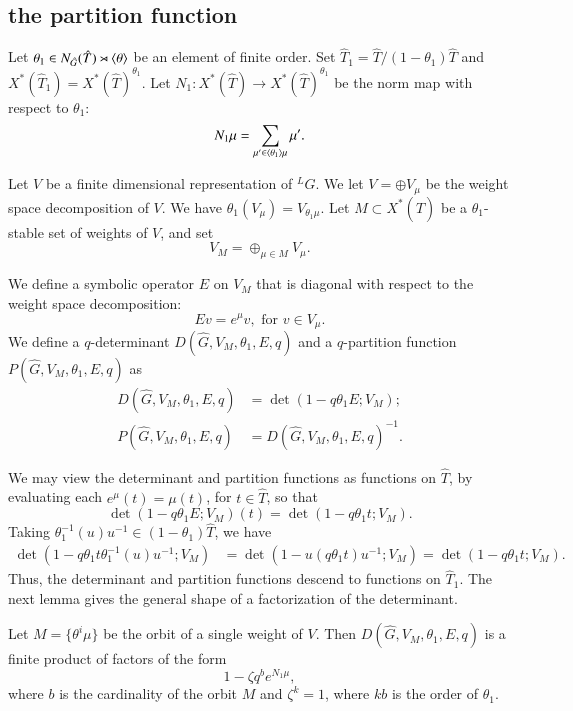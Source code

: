 \subsection{the partition function}

Let $\theta_1\in N_{\hat G}(\hat T) \rtimes \langle{\theta}\rangle$ be an element of finite order.
Set $\hat T_1 = \hat T/(1-\theta_1)\hat T$ and $X^*(\hat T_1) = X^*(\hat T)^{\theta_1}$.
Let $N_1:X^*(\hat T)\to X^*(\hat T)^{\theta_1}$ be the norm map with respect to $\theta_1$:
\[
N_1 \mu = \sum_{\mu'\in \langle{\theta_1}\rangle\mu} \mu'.
\]

Let $V$ be a finite dimensional representation of ${}^LG$.  We let $V=\oplus V_\mu$ be the weight space decomposition of $V$.
We have $\theta_1(V_\mu) = V_{\theta_1\mu}$.   Let $M\subset X^*(\hat T)$ be a $\theta_1$-stable set of weights of $V$, and
set
\[
V_M = \oplus_{\mu\in M} V_\mu.
\]

We define a symbolic operator $E$ on $V_M$ that is diagonal with
respect to the weight space decomposition:
\[
E v = e^{\mu} v, \text{ for } v \in V_\mu.
\]
We define a $q$-determinant $D(\hat G,V_M,\theta_1,E,q)$ and a $q$-partition function $P(\hat G,V_M,\theta_1,E,q)$ as
\begin{align}\label{eqn:det}
D(\hat G,V_M,\theta_1,E,q) &= \det(1- q \theta_1 E;V_M);\\ 
P(\hat G,V_M,\theta_1,E,q) &= D(\hat G,V_M,\theta_1,E,q)^{-1}.
\end{align}


We may view the determinant and partition functions as functions on $\hat T$, by evaluating each $e^\mu (t) = \mu(t)$, for $t\in \hat T$,
so that 
\[
\det(1- q\theta_1 E;V_M)(t) = \det(1-q\theta_1 t;V_M).
\]
Taking $\theta_1^{-1}(u) u^{-1}\in (1-\theta_1)\hat T$, we have
\begin{align*}
\det (1-q \theta_1 t \theta_1^{-1}(u) u^{-1};V_M) &= \det(1- u (q \theta_1 t ) u^{-1};V_M) = \det(1-q\theta_1 t;V_M).
\end{align*}
Thus, the determinant and partition functions descend to functions on $\hat T_1$.
The next lemma gives the general shape of a factorization of the determinant.

\begin{lemma}\label{lemma:fact}  Let $M = \{\theta^i\mu\}$ be the orbit of a single weight of $V$.  Then
$D(\hat G,V_M,\theta_1,E,q)$ is a finite product of factors of the form
\[
1 - \zeta q^b e^{N_1\mu},
\]
where $b$ is the cardinality of the orbit $M$ and $\zeta^k=1$, where $k b$ is the order of $\theta_1$.
\end{lemma}


